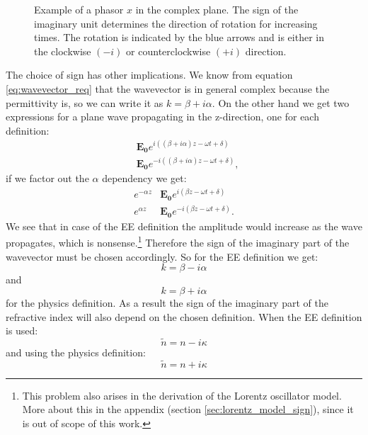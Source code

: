 \begin{figure}[h]
    \centering
    
    \caption{Example of a phasor $x$ in the complex plane. The sign of the imaginary unit determines the direction of rotation for increasing times. The rotation is indicated by the blue arrows and is either in the clockwise $(-i)$ or counterclockwise $(+i)$ direction.}
    \label{fig:phasor}
\end{figure}

The choice of sign has other implications. We know from equation \ref{eq:wavevector_req} that the wavevector is in general complex because the permittivity is, so we can write it as $k=\beta + i \alpha$. On the other hand we get two expressions for a plane wave propagating in the z-direction, one for each definition:
\begin{align}
    &\bm{E_{0}}e^{i((\beta + i \alpha)z-\omega t + \delta)} \\
    &\bm{E_{0}}e^{-i((\beta + i \alpha)z-\omega t + \delta)}, 
\end{align}
if we factor out the $\alpha$ dependency we get:
\begin{align}
    e^{-\alpha z}&\bm{E_{0}}e^{i(\beta z-\omega t + \delta)} \\
    e^{\alpha z}&\bm{E_{0}}e^{-i(\beta z-\omega t + \delta)}. 
\end{align}
We see that in case of the EE definition the amplitude would increase as the wave propagates, which is nonsense.\footnote{This problem also arises in the derivation of the Lorentz oscillator model. More about this in the appendix (section \ref{sec:lorentz_model_sign}), since it is out of scope of this work.} Therefore the sign of the imaginary part of the wavevector must be chosen accordingly. So for the EE definition we get:
\begin{equation}
    k=\beta - i \alpha
\end{equation}
and 
\begin{equation}
    k=\beta + i \alpha
\end{equation}
for the physics definition.
As a result the sign of the imaginary part of the refractive index will also depend on the chosen definition. When the EE definition is used:
\begin{equation}
    \tilde{n}= n - i \kappa
\end{equation}
and using the physics definition:  
\begin{equation}
    \tilde{n}= n + i \kappa
\end{equation}

